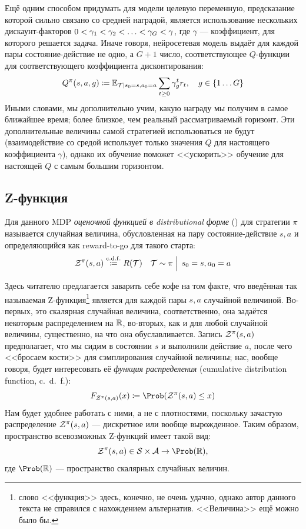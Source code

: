\begin{remark}
Ещё одним способом придумать для модели целевую переменную, предсказание которой сильно связано со средней наградой, является использование нескольких дискаунт-факторов $0 \HM< \gamma_1 \HM< \gamma_2 \HM< \dots \HM< \gamma_G \HM< \gamma$, где $\gamma$ --- коэффициент, для которого решается задача. Иначе говоря, нейросетевая модель выдаёт для каждой пары состояние-действие не одно, а $G+1$ число, соответствующее $Q$-функции для соответствующего коэффициента дисконтирования:
$$Q^\pi(s, a, g) \coloneqq \mathbb{E}_{\mathcal{T} \mid s_0 = s, a_0 = a} \sum_{t \ge 0} \gamma_g^t r_t, \quad g \in \{1 \dots G \}$$
Иными словами, мы дополнительно учим, какую награду мы получим в самое ближайшее время; более близкое, чем реальный рассматриваемый горизонт. Эти дополнительные величины самой стратегией использоваться не будут (взаимодействие со средой использует только значения $Q$ для настоящего коэффициента $\gamma$), однако их обучение поможет <<ускорить>> обучение для настоящей $Q$ с самым большим горизонтом. 
\end{remark}

\subsection{Z-функция}

\begin{definition} 
Для данного MDP \emph{оценочной функцией в distributional форме} () для стратегии $\pi$ называется случайная величина, обусловленная на пару состояние-действие $s, a$ и определяющийся как reward-to-go для такого старта:
$$\mathcal{Z}^\pi(s, a) \mathrel{\stackrel{\mathrm{c.d.f.}}\coloneqq} R(\mathcal{T}) \quad \mathcal{T} \sim \pi \mathrel{\Big|} \, s_0 = s, a_0 = a $$
\end{definition}

Здесь читателю предлагается заварить себе кофе на том факте, что введённая так называемая Z-функция\footnote{слово <<функция>> здесь, конечно, не очень удачно, однако автор данного текста не справился с нахождением альтернатив. <<Величина>> ещё можно было бы.} является для каждой пары $s, a$ случайной величиной. Во-первых, это скалярная случайная величина, соответственно, она задаётся некоторым распределением на $\mathbb{R}$, во-вторых, как и для любой случайной величины, существенно, на что она обуславливается. Запись $\mathcal{Z}^\pi(s, a)$ предполагает, что мы сидим в состоянии $s$ и выполнили действие $a$, после чего <<бросаем кости>> для сэмплирования случайной величины; нас, вообще говоря, будет интересовать её \emph{функция распределения} (cumulative distribution function, c.~d.~f.):
$$F_{\Z^\pi(s, a)}(x) \coloneqq \Prob (\Z^\pi(s, a) \le x)$$
Нам будет удобнее работать с ними, а не с плотностями, поскольку зачастую распределение $\mathcal{Z}^\pi(s, a)$ --- дискретное или вообще вырожденное. Таким образом, пространство всевозможных Z-функций имеет такой вид:
\begin{equation}\label{Zfunctionspace}
\Z^\pi(s, a) \in \St \times \A \to \Prob (\R),
\end{equation}
где $\Prob (\R)$ --- пространство скалярных случайных величин. 


